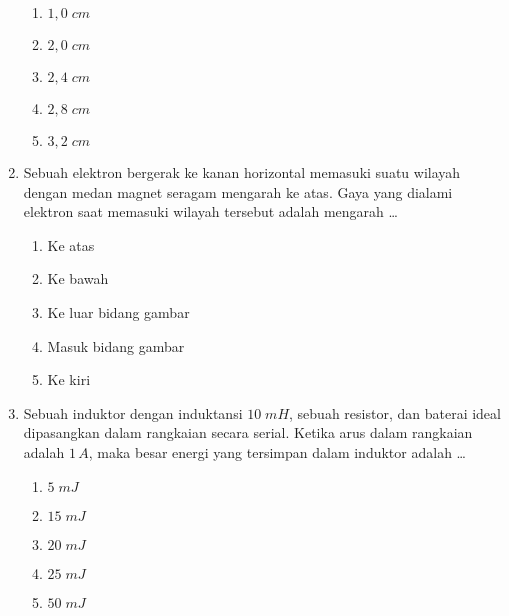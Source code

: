 \documentclass[A4,12PT, english, twocolumn]{journal}
\begin{document}
\begin{enumerate}
\begin{center}
\end{center}
    \begin{enumerate}
        \item $1,0 \; cm$
        \item $2,0 \; cm$
        \item $2,4 \; cm$
        \item $2,8 \; cm$
        \item $3,2 \; cm$
    \end{enumerate}

\item Sebuah elektron bergerak ke kanan horizontal memasuki suatu wilayah dengan medan magnet seragam mengarah ke atas. Gaya yang dialami elektron saat memasuki wilayah tersebut adalah mengarah \dots
    \begin{enumerate}
        \item Ke atas 
        \item Ke bawah 
        \item Ke luar bidang gambar 
        \item Masuk bidang gambar 
        \item Ke kiri
    \end{enumerate}

\item Sebuah induktor dengan induktansi $10 \; mH$, sebuah resistor, dan baterai ideal dipasangkan dalam rangkaian secara serial. Ketika arus dalam rangkaian adalah $1 \, A$, maka besar energi yang tersimpan dalam induktor adalah \dots
    \begin{enumerate}
        \item $5 \; mJ$
        \item $15 \; mJ$
        \item $20 \; mJ$
        \item $25 \; mJ$
        \item $50 \; mJ$
    \end{enumerate}
    

\end{enumerate}
\end{document}
